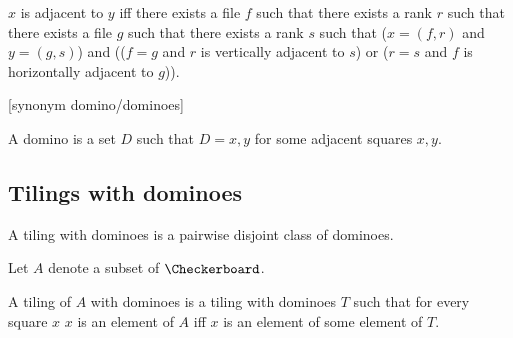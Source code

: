 \begin{forthel}


    \begin{definition}[Adjacency]
        $x$ is adjacent to $y$ iff
        there exists a file $f$ such that
        there exists a rank $r$ such that
        there exists a file $g$ such that
        there exists a rank $s$ such that
        ($x=(f,r)$ and $y=(g,s)$) and (($f=g$ and $r$ is vertically adjacent to $s$) or
        ($r=s$ and $f$ is horizontally adjacent to $g$)).
    \end{definition}

    [synonym domino/dominoes]
    \begin{definition}
        A domino is a set $D$ such that $D = {x,y}$ for some
        adjacent squares $x, y$.
    \end{definition}
\end{forthel}



\subsection{Tilings with dominoes}

\begin{forthel}
    \begin{definition}
        A tiling with dominoes is a pairwise disjoint class of dominoes.
    \end{definition}

    Let $A$ denote a subset of $\Checkerboard$.

    \begin{definition}
        A tiling of $A$ with dominoes is a tiling with dominoes $T$
        such that for every square $x$
        $x$ is an element of $A$ iff
        $x$ is an element of some element of $T$.
    \end{definition}
\end{forthel}

